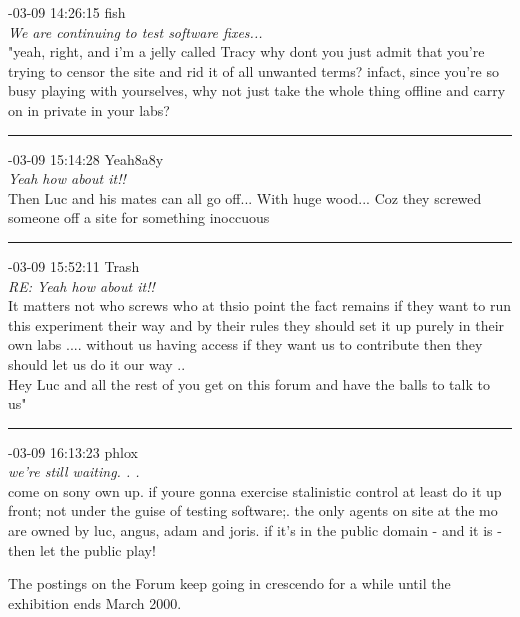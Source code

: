 \begin{mail}
{-03-09 14:26:15 fish}\\
{\itshape We are continuing to test software fixes...}\\
"yeah, right, and i'm a jelly called Tracy
why dont you just admit that you're trying to censor the site and rid it of all unwanted terms? infact, since you're so busy playing with yourselves, why not just take the whole thing offline and carry on in private in your labs?	\\

\rule{0.8\textwidth}{.4pt}

{-03-09 15:14:28 Yeah8a8y}\\
{\itshape Yeah how about it!!}\\
Then Luc and his mates can all go off... With huge wood... Coz they screwed someone off a site for something inoccuous\\


\rule{0.8\textwidth}{.4pt}


{-03-09 15:52:11 Trash}\\
{\itshape RE: Yeah how about it!!}\\
It matters not who screws who at thsio point the fact remains if they want to run this experiment their way and by their rules they should set it up purely in their own labs .... without us having access if they want us to contribute then they should let us do it our way ..\\
Hey Luc and all the rest of you get on this forum and have the balls to talk to us"\\

\rule{0.8\textwidth}{.4pt}

{-03-09 16:13:23 phlox}\\
{\itshape we're still waiting. . .}\\
come on sony own up. if youre gonna exercise stalinistic control at least do it up front; not under the guise of testing software;. the only agents on site at the mo are owned by luc, angus, adam and joris. if it's in the public domain - and it is -  then let the public play!
%
\end{mail}

The postings on the Forum keep going in crescendo for a while until the exhibition ends March 2000. 

